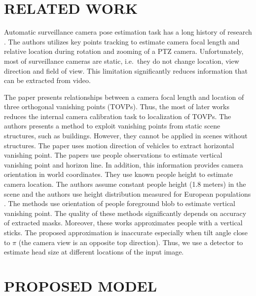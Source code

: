 \section{\uppercase{Related Work}}
\label{sec:related}

\noindent Automatic surveillance camera pose estimation task has a long history of research \cite{caprile1990using,li2010simultaneous,liu2011surveillance,chen2007accurate,pflugfelder2007people,den2015automatic,puwein2012ptz,dubska2014automatic}. The authors \cite{puwein2012ptz} utilizes key points tracking to estimate camera focal length and relative location during rotation and zooming of a PTZ camera. Unfortunately, most of surveillance cameras are static, i.e.\ they do not change location, view direction and field of view. This limitation significantly reduces information that can be extracted from video.

The paper \cite{caprile1990using} presents relationships between a camera focal length and location of three orthogonal vanishing points (TOVPs). Thus, the most of later works reduces the internal camera calibration task to localization of TOVPs. The authors \cite{li2010simultaneous} presents a method to exploit vanishing points from static scene structures, such as buildings. However, they cannot be applied in scenes without structures. The paper \cite{dubska2014automatic} uses motion direction of vehicles to extract horizontal vanishing point. The papers \cite{chen2007accurate,liu2011surveillance,den2015automatic} use people observations to estimate vertical vanishing point and horizon line. In addition, this information provides camera orientation in world coordinates. They use known people height to estimate camera location. The authors \cite{den2015automatic} assume constant people height (1.8 meters) in the scene and the authors \cite{liu2011surveillance} use height distribution measured for European populations \cite{visscher2008sizing}. The methods \cite{chen2007accurate,liu2011surveillance} use orientation of people foreground blob to estimate vertical vanishing point. The quality of these methods significantly depends on accuracy of extracted masks. Moreover, these works approximates people with a vertical sticks. The proposed approximation is inaccurate especially when tilt angle close to $\pi$ (the camera view is an opposite top direction). Thus, we use a detector to estimate head size at different locations of the input image.

\section{\uppercase{Proposed Model}}
\label{sec:proposed}

